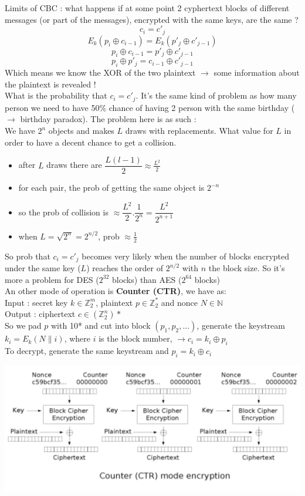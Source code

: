 \documentclass[11pt,a4paper]{report}
\begin{document}
Limits of CBC : what happens if at some point 2 cyphertext blocks of different messages (or part of the messages), encrypted with the same keys, are the same ?
$$c_i = c'_j$$
$$E_k(p_i \oplus c_{i-1}) = E_k(p'_j \oplus c'_{j-1})$$
$$p_i \oplus c_{i-1} = p'_j \oplus c'_{j-1}$$ 
$$p_i \oplus p'_j = c_{i-1} \oplus c'_{j-1}$$
Which means we know the XOR of the two plaintext $\longrightarrow$ some information about the plaintext is revealed !\\
What is the probability that $c_i = c'_j$. It's the same kind of problem as how many person we need to have 50\% chance of having 2 person with the same birthday ($\longrightarrow$ birthday paradox). The problem here is as such :\\
We have $2^n$ objects and makes $L$ draws with replacements. What value for $L$ in order to have a decent chance to get a collision.\\
\begin{itemize}
\item after $L$ draws there are $\dfrac{L(l-1)}{2} \approx \frac{L^2}{2}$
\item for each pair, the prob of getting the same object is $2^{-n}$
\item so the prob of collision is $\approx \dfrac{L^2}{2}.\dfrac{1}{2^n} = \dfrac{L^2}{2^{n+1}}$
\item when $L = \sqrt{2^n} = 2^{n/2}$, prob $\approx \frac{1}{2}$
\end{itemize}
So prob that $c_i = c'_j$ becomes very likely when the number of blocks encrypted under the same key ($L$) reaches the order of $2^{n/2}$ with $n$ the block size. So it's more a problem for DES ($2^{32}$ blocks) than AES ($2^{64}$ blocks)\\

An other mode of operation is \textbf{Counter (CTR)}, we have as:\\
Input : secret key $k \in \mathbb{Z}_2^m$, plaintext $p \in \mathbb{Z}_2^*$ and nonce $N \in \mathbb{N}$\\
Output : ciphertext $c \in \left(\mathbb{Z}_2^n \right)*$\\
So we pad $p$ with 10* and cut into block $\left( p_1,p_2,...\right)$, generate the keystream $k_i = E_k(N \parallel i)$, where $i$ is the block number, $\longrightarrow c_i = k_i \oplus p_i$\\
To decrypt, generate the same keystream and $p_i = k_i \oplus c_i$ 
\begin{center}
\includegraphics[scale=0.5]{img/img10.png}
\end{center}
\end{document}

